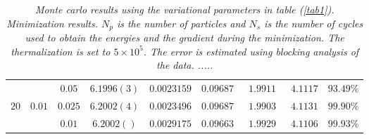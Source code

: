 \documentclass[a4paper,10pt,twocolumn]{article} %
\begin{document}
\begin{table*}[ht!]
\begin{center}
\begin{tabular}{|c|c|c|c|c|c|c|c|c|}
\hline
	& 	 	& $0.05$  & $6.1996(3)$ & $0.0023159$ & $0.09687$ & $1.9911$ & $4.1117$ & $93.49\%$\\ 
$20$&$0.01$ & $0.025$ & $6.2002(4)$ & $0.0023496$ & $0.09687$ & $1.9903$ & $4.1131$ & $99.90\%$\\ 
	&  		& $0.01$  & $6.2002()$ & $0.0029175$ & $0.09663$ & $1.9929$ & $4.1106$ & $99.93\%$\\ 
\hline
\end{tabular}
\end{center}
\caption{{\it 
	Monte carlo results using the variational parameters in table (\ref{tab1}).
	Minimization results. $N_p$ is the number of particles and $N_s$ is the number of cycles used to obtain the energies and the gradient during the minimization.
	The thermalization is set to $5\times 10^5$. The error is estimated using blocking analysis of the data.  .....
}}
\label{tab2}
\end{table*}


\end{document}
